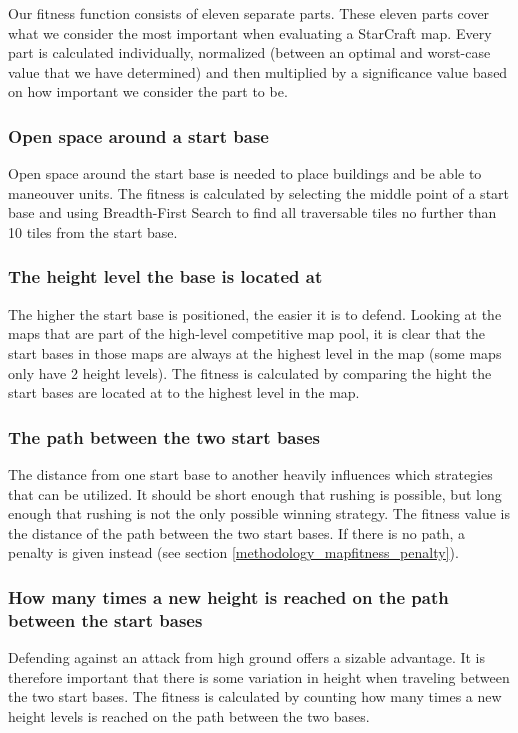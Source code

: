 Our fitness function consists of eleven separate parts. These eleven parts cover what we consider the most important when evaluating a StarCraft map. Every part is calculated individually, normalized (between an optimal and worst-case value that we have determined) and then multiplied by a significance value based on how important we consider the part to be.

	\subsubsection*{Open space around a start base} 
	Open space around the start base is needed to place buildings and be able to maneouver units. The fitness is calculated by selecting the middle point of a start base and using Breadth-First Search to find all traversable tiles no further than 10 tiles from the start base.

	\subsubsection*{The height level the base is located at}
	The higher the start base is positioned, the easier it is to defend. Looking at the maps that are part of the high-level competitive map pool, it is clear that the start bases in those maps are always at the highest level in the map (some maps only have 2 height levels). The fitness is calculated by comparing the hight the start bases are located at to the highest level in the map. 

	\subsubsection*{The path between the two start bases}
	The distance from one start base to another heavily influences which strategies that can be utilized. It should be short enough that rushing is possible, but long enough that rushing is not the only possible winning strategy. The fitness value is the distance of the path between the two start bases. If there is no path, a penalty is given instead (see section \ref{methodology_mapfitness_penalty}).

	\subsubsection*{How many times a new height is reached on the path between the start bases}
	Defending against an attack from high ground offers a sizable advantage. It is therefore important that there is some variation in height when traveling between the two start bases. The fitness is calculated by counting how many times a new height levels is reached on the path between the two bases.

